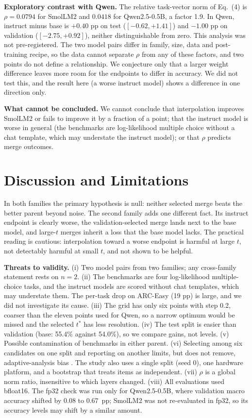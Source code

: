 \documentclass[conference]{IEEEtran}
\begin{document}
\textbf{Exploratory contrast with Qwen.} The relative task-vector norm of Eq.~(4) is $\rho=0.0794$ for SmolLM2 and $0.0418$ for Qwen2.5-0.5B, a factor 1.9. In Qwen, instruct minus base is $+0.40$ pp on test ($[-0.62,+1.41]$) and $-1.00$ pp on validation ($[-2.75,+0.92]$), neither distinguishable from zero. This analysis was not pre-registered. The two model pairs differ in family, size, data and post-training recipe, so the data cannot separate $\rho$ from any of these factors, and two points do not define a relationship. We conjecture only that a larger weight difference leaves more room for the endpoints to differ in accuracy. We did not test this, and the result here (a worse instruct model) shows a difference in one direction only.

\textbf{What cannot be concluded.} We cannot conclude that interpolation improves SmolLM2 or fails to improve it by a fraction of a point; that the instruct model is worse in general (the benchmarks are log-likelihood multiple choice without a chat template, which may understate the instruct model); or that $\rho$ predicts merge outcomes.

\section{Discussion and Limitations}
In both families the primary hypothesis is null: neither selected merge beats the better parent beyond noise. The second family adds one different fact. Its instruct endpoint is clearly worse, the validation-selected merge lands next to the base model, and large-$t$ merges inherit a loss that the base model lacks. The practical reading is cautious: interpolation toward a worse endpoint is harmful at large $t$, not detectably harmful at small $t$, and not shown to be helpful.

\textbf{Threats to validity.} (i) Two model pairs from two families; any cross-family statement rests on $n=2$. (ii) The benchmarks are four log-likelihood multiple-choice tasks, and the instruct models are scored without chat templates, which may understate them. The per-task drop on ARC-Easy (19 pp) is large, and we did not investigate its cause. (iii) The grid has only six points with step 0.2, coarser than the eleven points used for Qwen, so a narrow optimum would be missed and the selected $t^\ast$ has less resolution. (iv) The test split is easier than validation (base: 55.4\% against 54.0\%), so we compare gains, not levels. (v) Possible contamination of benchmarks in either parent. (vi) Selecting among six candidates on one split and reporting on another limits, but does not remove, adaptive-analysis bias \cite{dwork2015adaptive}. The study also uses a single split (seed 0), one hardware platform, and a bootstrap that treats items as independent. (vii) $\rho$ is a global norm ratio, insensitive to which layers changed. (viii) All evaluations used bfloat16. The fp32 check was run only for Qwen2.5-0.5B, where validation macro accuracy shifted by $0.08$ to $0.67$~pp; SmolLM2 was not re-evaluated in fp32, so its accuracy levels may shift by a similar amount.
\end{document}
